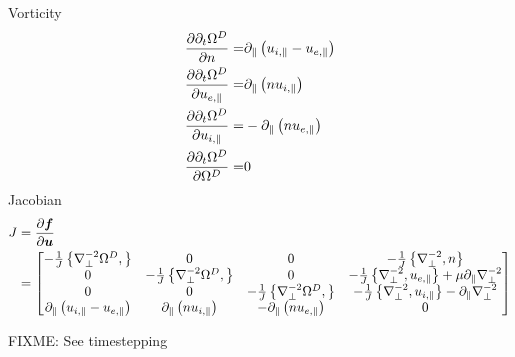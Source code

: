 Vorticity
\begin{align*}
  \frac{\partial {\partial_t \Omega^D}}{\partial{n}} =&
  \partial_\| \left(u_{i,\|} - u_{e,\|} \right)
  \\
  \frac{\partial {\partial_t \Omega^D}}{\partial{u_{e,\|}}} =&
  \partial_\| \left(nu_{i,\|} \right)
  \\
  \frac{\partial {\partial_t \Omega^D}}{\partial{u_{i,\|}}} =&
  -\partial_\| \left(nu_{e,\|} \right)
  \\
  \frac{\partial {\partial_t \Omega^D}}{\partial{\Omega^D}} =&
  0
\end{align*}
Jacobian
\begin{align*}
    J &= \frac{\partial {\boldsymbol{f}}}{\partial{\boldsymbol{u}}}\\
    &=
    \begin{bmatrix}
        -\frac{1}{J}\left\{\nabla_\perp^{-2}\Omega^D,\right\}
        & 0
        & 0
        & -\frac{1}{J}\left\{\nabla_\perp^{-2},n\right\}
        \\
        0
        & -\frac{1}{J}\left\{\nabla_\perp^{-2}\Omega^D,\right\}
        & 0
        & -\frac{1}{J}\left\{\nabla_\perp^{-2},u_{e,\|}\right\}
          +\mu \partial_\| \nabla_\perp^{-2}
        \\
        0
        & 0
        & -\frac{1}{J}\left\{\nabla_\perp^{-2}\Omega^D,\right\}
        & -\frac{1}{J}\left\{\nabla_\perp^{-2},u_{i,\|}\right\} -
            \partial_\|\nabla_\perp^{-2}
        \\
        \partial_\| \left(u_{i,\|} - u_{e,\|} \right)
        & \partial_\| \left(nu_{i,\|} \right)
        & -\partial_\| \left(nu_{e,\|} \right)
        & 0
    \end{bmatrix}
\end{align*}
%

FIXME: See timestepping

